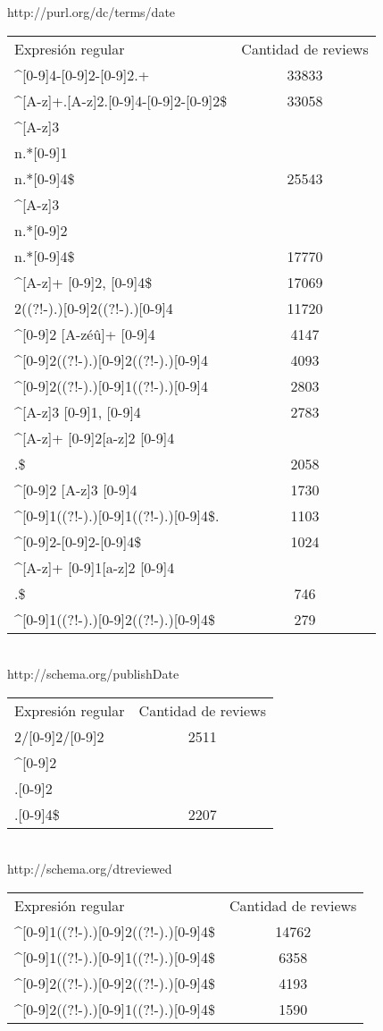 http://purl.org/dc/terms/date
\begin{tabular}{| l | c |}
Expresión regular & Cantidad de reviews\\
^[0-9]{4}-[0-9]{2}-[0-9]{2}.+ & 33833\\
^[A-z]+.[A-z]{2}.[0-9]{4}-[0-9]{2}-[0-9]{2}\$ & 33058\\
^[A-z]{3}\\n.*[0-9]{1}\\n.*[0-9]{4}\$ & 25543\\
^[A-z]{3}\\n.*[0-9]{2}\\n.*[0-9]{4}\$ & 17770\\
^[A-z]+ [0-9]{2}, [0-9]{4}\$ & 17069\\
[0-9]{2}((?!-).)[0-9]{2}((?!-).)[0-9]{4} & 11720\\
^[0-9]{2} [A-zéû]+ [0-9]{4} & 4147\\
^[0-9]{2}((?!-).)[0-9]{2}((?!-).)[0-9]{4} & 4093\\
^[0-9]{2}((?!-).)[0-9]{1}((?!-).)[0-9]{4} & 2803\\
^[A-z]{3} [0-9]{1}, [0-9]{4} & 2783\\
^[A-z]+ [0-9]{2}[a-z]{2} [0-9]{4}\\.\$ & 2058\\
^[0-9]{2} [A-z]{3} [0-9]{4} & 1730\\
^[0-9]{1}((?!-).)[0-9]{1}((?!-).)[0-9]{4}\$. & 1103\\
^[0-9]{2}-[0-9]{2}-[0-9]{4}\$ & 1024\\
^[A-z]+ [0-9]{1}[a-z]{2} [0-9]{4}\\.\$ & 746\\
^[0-9]{1}((?!-).)[0-9]{2}((?!-).)[0-9]{4}\$ & 279\\
\end{tabular}

\\
http://schema.org/publishDate
\begin{tabular}{| l | c |}
Expresión regular & Cantidad de reviews\\
[0-9]{2}/[0-9]{2}/[0-9]{2} & 2511\\
^[0-9]{2}\\.[0-9]{2}\\.[0-9]{4}\$ & 2207
\end{tabular}

\\
http://schema.org/dtreviewed
\begin{tabular}{| l | c |}
Expresión regular & Cantidad de reviews\\
^[0-9]{1}((?!-).)[0-9]{2}((?!-).)[0-9]{4}\$ & 14762\\
^[0-9]{1}((?!-).)[0-9]{1}((?!-).)[0-9]{4}\$ & 6358\\
^[0-9]{2}((?!-).)[0-9]{2}((?!-).)[0-9]{4}\$ & 4193\\
^[0-9]{2}((?!-).)[0-9]{1}((?!-).)[0-9]{4}\$ & 1590
\end{tabular}

